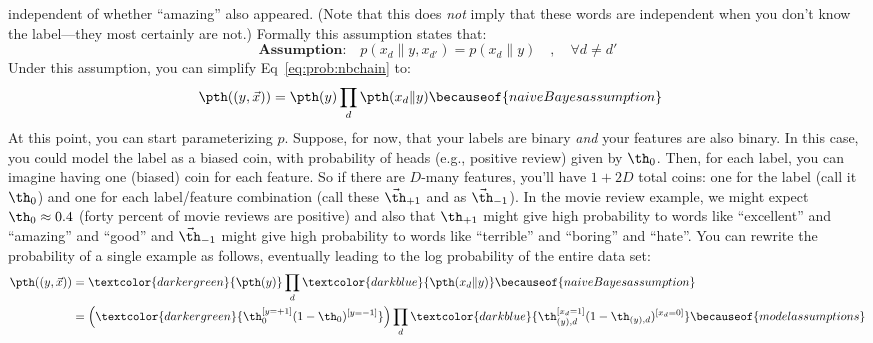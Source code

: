 independent of whether ``amazing'' also appeared.  (Note that this
does \emph{not} imply that these words are independent when you don't
know the label---they most certainly are not.)  Formally this
assumption states that:
%
\begin{equation} \label{eq:prob:nbassumption}
\textbf{Assumption:}\quad
  p(x_d \| y, x_{d'}) = p(x_d \| y) \quad,\quad \forall d \neq d'
\end{equation}
%
Under this assumption, you can simplify Eq~\eqref{eq:prob:nbchain} to:
%
\begin{align} \label{eq:prob:nb}
  \pth( (y, \vec x) )
&= \pth(y) \prod_d \pth(x_d \| y)
\becauseof{naive Bayes assumption}
\end{align}
%
At this point, you can start parameterizing $p$.  Suppose, for now,
that your labels are binary \emph{and} your features are also binary.
In this case, you could model the label as a biased coin, with
probability of heads (e.g., positive review) given by $\th_0$.  Then,
for each label, you can imagine having one (biased) coin for each
feature.  So if there are $D$-many features, you'll have $1+2D$ total
coins: one for the label (call it $\th_0$) and one for each
label/feature combination (call these $\vec\th_{+1}$ and as
$\vec\th_{-1}$).  In the movie review example, we might expect $\th_0
\approx 0.4$ (forty percent of movie reviews are positive) and also
that $\th_{+1}$ might give high probability to words like
``excellent'' and ``amazing'' and ``good'' and $\vec\th_{-1}$ might
give high probability to words like ``terrible'' and ``boring'' and
``hate''.  You can rewrite the probability of a single example as
follows, eventually leading to the log probability of the entire data
set:
%
\begin{align} \label{eq:prob:nbmult}
  \pth( (y, \vec x) )
&= \textcolor{darkergreen}{\pth(y)} \prod_d \textcolor{darkblue}{\pth(x_d \| y)}
\becauseof{naive Bayes assumption}\\
&= \left( \textcolor{darkergreen}{
      \th_0^{[y=+1]} (1-\th_0)^{[y=-1]}
    }\right)
  \prod_d
   \textcolor{darkblue}{
       \th_{(y),d}^{[x_d=1]}
       (1-\th_{(y),d})^{[x_d=0]}
       } \becauseof{model assumptions}
\end{align}

